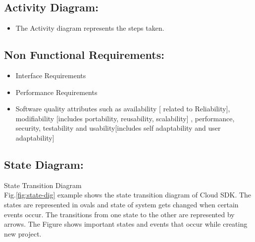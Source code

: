 \documentclass[oneside,a4paper,12pt]{report}
\begin{document}
\subsection{Activity Diagram:}
\begin{itemize}
	\item	The Activity diagram represents the steps taken.
\end{itemize}

\subsection{Non Functional Requirements:}
\begin{itemize}
	\item	Interface Requirements
	\item	Performance Requirements
    \item	Software quality attributes such as availability [ related to Reliability], modifiability [includes portability, reusability, scalability] ,  		performance, security, testability and usability[includes self 			adaptability and user adaptability]
\end{itemize}

\subsection{State Diagram:}
  State Transition Diagram\\
Fig.\ref{fig:state-dig} example shows the state transition diagram of Cloud SDK. The states are
represented in ovals and state of system gets changed when certain events occur. The transitions from one state to the other are represented by arrows. The Figure    shows important states and events that occur while creating new project.
\end{document}
